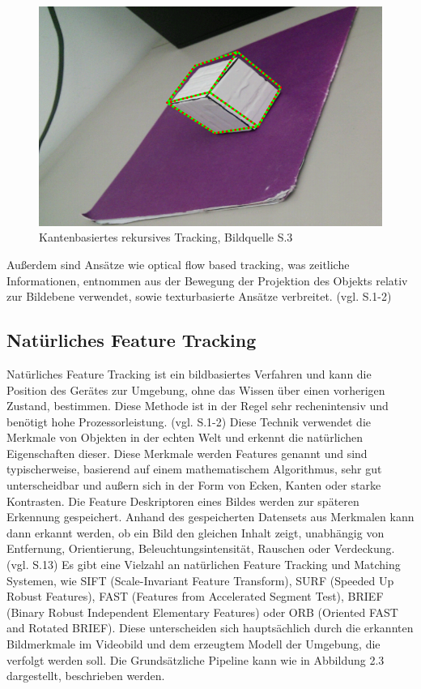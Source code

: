 \begin{figure}[H]
	\centering
	\includegraphics[scale=0.7]{wire.png}
	\caption{Kantenbasiertes rekursives Tracking, Bildquelle \cite{model_based} S.3}
\end{figure} 

Außerdem sind Ansätze wie \glqq optical flow based tracking\grqq{}, was zeitliche Informationen, entnommen aus der Bewegung der Projektion des Objekts relativ zur Bildebene verwendet, sowie texturbasierte Ansätze verbreitet. (vgl. \cite{model_based} S.1-2)



\subsection{Natürliches Feature Tracking}

Natürliches Feature Tracking ist ein bildbasiertes Verfahren und kann die Position des Gerätes zur Umgebung, ohne das Wissen über einen vorherigen Zustand, bestimmen. Diese Methode ist in der Regel sehr rechenintensiv und benötigt hohe Prozessorleistung. (vgl. \cite{model_based} S.1-2) Diese Technik verwendet die Merkmale von Objekten in der echten Welt und erkennt die natürlichen Eigenschaften dieser. Diese Merkmale werden Features genannt und sind typischerweise, basierend auf einem mathematischem Algorithmus, sehr gut unterscheidbar und außern sich in der Form von Ecken, Kanten oder starke Kontrasten. Die Feature Deskriptoren eines Bildes werden zur späteren Erkennung gespeichert. Anhand des gespeicherten Datensets aus Merkmalen kann dann erkannt werden, ob ein Bild den gleichen Inhalt zeigt, unabhängig von Entfernung, Orientierung, Beleuchtungsintensität, Rauschen oder Verdeckung. (vgl. \cite{comparative_sdks} S.13) Es gibt eine Vielzahl an natürlichen Feature Tracking und Matching Systemen, wie SIFT (Scale-Invariant Feature Transform), SURF (Speeded Up Robust Features), FAST (Features from Accelerated Segment Test), BRIEF (Binary Robust Independent Elementary Features) oder ORB (Oriented FAST and Rotated BRIEF). Diese unterscheiden sich hauptsächlich durch die erkannten Bildmerkmale im Videobild und dem erzeugtem Modell der Umgebung, die verfolgt werden soll. Die Grundsätzliche Pipeline kann wie in Abbildung 2.3 dargestellt, beschrieben werden.

